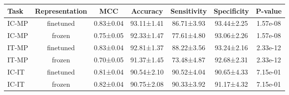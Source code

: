 \begin{tabular}{lcccccc}
\toprule
 Task & Representation &       MCC &   Accuracy & Sensitivity & Specificity &  P-value \\
\midrule
IC-MP &      finetuned & 0.83±0.04 & 93.11±1.41 &  86.71±3.93 &  93.44±2.25 & 1.57e-08 \\
IC-MP &         frozen & 0.75±0.05 & 92.33±1.47 &  77.61±4.80 &  93.06±2.26 & 1.57e-08 \\
IT-MP &      finetuned & 0.83±0.04 & 92.81±1.37 &  88.22±3.56 &  93.24±2.16 & 2.33e-12 \\
IT-MP &         frozen & 0.70±0.05 & 91.37±1.45 &  73.48±4.87 &  92.68±2.31 & 2.33e-12 \\
IC-IT &      finetuned & 0.81±0.04 & 90.54±2.10 &  90.52±4.04 &  90.65±4.33 & 7.15e-01 \\
IC-IT &         frozen & 0.82±0.04 & 90.75±2.08 &  90.33±3.92 &  91.17±4.32 & 7.15e-01 \\
\bottomrule
\end{tabular}

